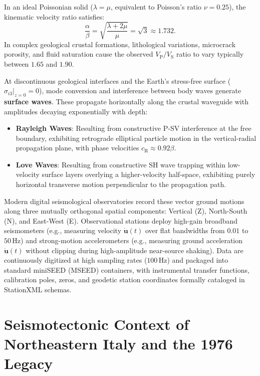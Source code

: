 In an ideal Poissonian solid ($\lambda = \mu$, equivalent to Poisson's ratio $\nu = 0.25$), the kinematic velocity ratio satisfies:
\begin{equation}
  \frac{\alpha}{\beta} = \sqrt{\frac{\lambda + 2\mu}{\mu}} = \sqrt{3} \approx 1.732.
  \label{eq:poisson_ratio}
\end{equation}
In complex geological crustal formations, lithological variations, microcrack porosity, and fluid saturation cause the observed $V_{\mathrm{P}}/V_{\mathrm{S}}$ ratio to vary typically between $1.65$ and $1.90$.

At discontinuous geological interfaces and the Earth's stress-free surface ($\sigma_{i3}|_{z=0} = 0$), mode conversion and interference between body waves generate \textbf{surface waves}. These propagate horizontally along the crustal waveguide with amplitudes decaying exponentially with depth:
\begin{itemize}
  \item \textbf{Rayleigh Waves}: Resulting from constructive P-SV interference at the free boundary, exhibiting retrograde elliptical particle motion in the vertical-radial propagation plane, with phase velocities $c_{\mathrm{R}} \approx 0.92\beta$.
  \item \textbf{Love Waves}: Resulting from constructive SH wave trapping within low-velocity surface layers overlying a higher-velocity half-space, exhibiting purely horizontal transverse motion perpendicular to the propagation path.
\end{itemize}

Modern digital seismological observatories record these vector ground motions along three mutually orthogonal spatial components: Vertical (Z), North-South (N), and East-West (E). Observational stations deploy high-gain broadband seismometers (e.g., measuring velocity $\dot{\mathbf{u}}(t)$ over flat bandwidths from $0.01$ to $50\,\mathrm{Hz}$) and strong-motion accelerometers (e.g., measuring ground acceleration $\ddot{\mathbf{u}}(t)$ without clipping during high-amplitude near-source shaking). Data are continuously digitized at high sampling rates ($100\,\mathrm{Hz}$) and packaged into standard miniSEED (MSEED) containers, with instrumental transfer functions, calibration poles, zeros, and geodetic station coordinates formally cataloged in StationXML schemas.

\section{Seismotectonic Context of Northeastern Italy and the 1976 Legacy}
\label{sec:tectonics}

